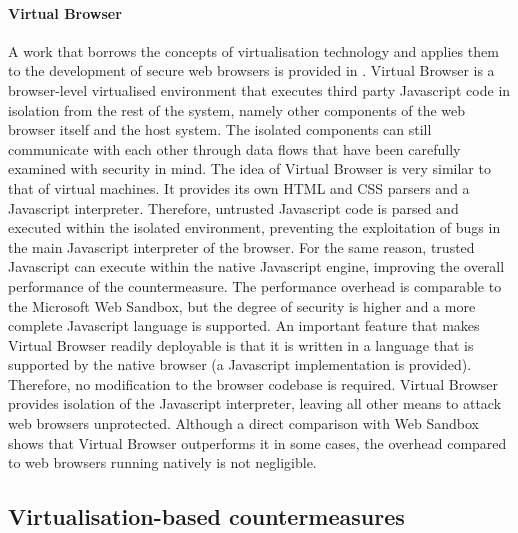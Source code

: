 \paragraph{Virtual Browser}
A work that borrows the concepts of virtualisation technology and applies them to the development of secure web browsers is provided in \cite{virtualbrowser}. Virtual Browser is a browser-level virtualised environment that executes third party Javascript code in isolation from the rest of the system, namely other components of the web browser itself and the host system. The isolated components can still communicate with each other through data flows that have been carefully examined with security in mind. 
The idea of Virtual Browser is very similar to that of virtual machines. It provides its own HTML and CSS parsers and a Javascript interpreter. Therefore, untrusted Javascript code is parsed and executed within the isolated environment, preventing the exploitation of bugs in the main Javascript interpreter of the browser.
For the same reason, trusted Javascript can execute within the native Javascript engine, improving the overall performance of the countermeasure. The performance overhead is comparable to the Microsoft Web Sandbox, but the degree of security is higher and a more complete Javascript language is supported.
An important feature that makes Virtual Browser readily deployable is that it is written in a language that is supported by the native browser (a Javascript implementation is provided). Therefore, no modification to the browser codebase is required. Virtual Browser provides isolation of the Javascript interpreter, leaving all other means to attack web browsers unprotected. Although a direct comparison with Web Sandbox shows that Virtual Browser outperforms it in some cases, the overhead compared to web browsers running natively is not negligible. 


\subsection{Virtualisation-based countermeasures}\label{virtbased}

